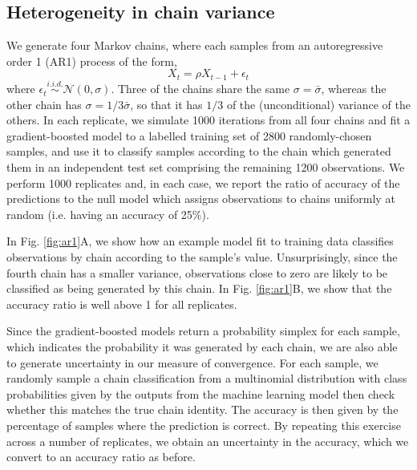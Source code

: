 \documentclass{article}
\begin{document}
\subsection{Heterogeneity in chain variance}\label{sec:heterogeneity}
We generate four Markov chains, where each samples from an autoregressive order 1 (AR1) process of the form,
%
\begin{equation}
X_t = \rho X_{t-1} + \epsilon_t
\end{equation}
%
where $\epsilon_t\stackrel{i.i.d.}{\sim}\mathcal{N}(0, \sigma)$. Three of the chains share the same $\sigma=\bar{\sigma}$, whereas the other chain has $\sigma=1/3\bar{\sigma}$, so that it has $1/3$ of the (unconditional) variance of the others. In each replicate, we simulate 1000 iterations from all four chains and fit a gradient-boosted model to a labelled training set of 2800 randomly-chosen samples, and use it to classify samples according to the chain which generated them in an independent test set comprising the remaining 1200 observations. We perform 1000 replicates and, in each case, we report the ratio of accuracy of the predictions to the null model which assigns observations to chains uniformly at random (i.e. having an accuracy of 25\%).

In Fig. \ref{fig:ar1}A, we show how an example model fit to training data classifies observations by chain according to the sample's value. Unsurprisingly, since the fourth chain has a smaller variance, observations close to zero are likely to be classified as being generated by this chain. In Fig. \ref{fig:ar1}B, we show that the accuracy ratio is well above 1 for all replicates.


Since the gradient-boosted models return a probability simplex for each sample, which indicates the probability it was generated by each chain, we are also able to generate uncertainty in our measure of convergence. For each sample, we randomly sample a chain classification from a multinomial distribution with class probabilities given by the outputs from the machine learning model then check whether this matches the true chain identity. The accuracy is then given by the percentage of samples where the prediction is correct. By repeating this exercise across a number of replicates, we obtain an uncertainty in the accuracy, which we convert to an accuracy ratio as before.
\end{document}
